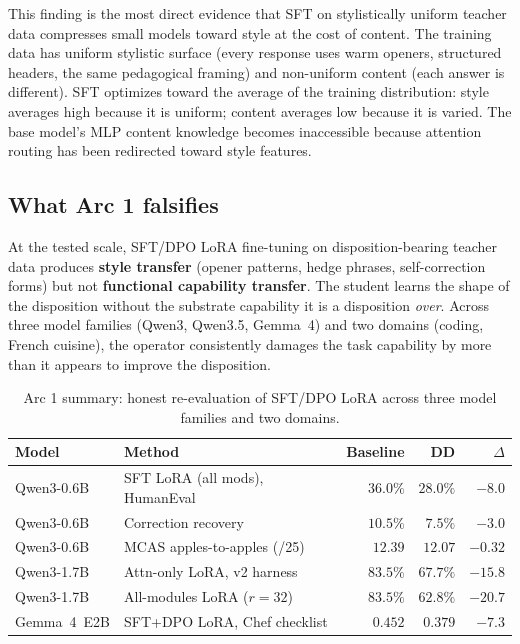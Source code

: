 \documentclass[11pt,a4paper]{article}
\begin{document}
This finding is the most direct evidence that SFT on stylistically uniform teacher data compresses small models toward style at the cost of content. The training data has uniform stylistic surface (every response uses warm openers, structured headers, the same pedagogical framing) and non-uniform content (each answer is different). SFT optimizes toward the average of the training distribution: style averages high because it is uniform; content averages low because it is varied. The base model's MLP content knowledge becomes inaccessible because attention routing has been redirected toward style features.

\subsection{What Arc 1 falsifies}

At the tested scale, SFT/DPO LoRA fine-tuning on disposition-bearing teacher data produces \textbf{style transfer} (opener patterns, hedge phrases, self-correction forms) but not \textbf{functional capability transfer}. The student learns the shape of the disposition without the substrate capability it is a disposition \emph{over}. Across three model families (Qwen3, Qwen3.5, Gemma~4) and two domains (coding, French cuisine), the operator consistently damages the task capability by more than it appears to improve the disposition.

\begin{table}[h]
\centering
\small
\caption{Arc 1 summary: honest re-evaluation of SFT/DPO LoRA across three model families and two domains.}
\label{tab:arc1}
\begin{tabular}{llrrr}
\toprule
Model & Method & Baseline & DD & $\Delta$ \\
\midrule
Qwen3-0.6B  & SFT LoRA (all mods), HumanEval & $36.0\%$ & $28.0\%$ & $\mathbf{-8.0}$ \\
Qwen3-0.6B  & Correction recovery & $10.5\%$ & $7.5\%$ & $\mathbf{-3.0}$ \\
Qwen3-0.6B  & MCAS apples-to-apples (/25) & $12.39$ & $12.07$ & $\mathbf{-0.32}$ \\
Qwen3-1.7B  & Attn-only LoRA, v2 harness & $83.5\%$ & $67.7\%$ & $\mathbf{-15.8}$ \\
Qwen3-1.7B  & All-modules LoRA ($r{=}32$) & $83.5\%$ & $62.8\%$ & $\mathbf{-20.7}$ \\
Gemma~4~E2B & SFT+DPO LoRA, Chef checklist & $0.452$ & $0.379$ & $\mathbf{-7.3}$ \\
\bottomrule
\end{tabular}
\end{table}
\end{document}
